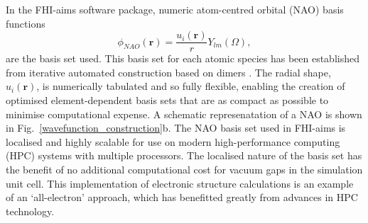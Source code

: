 \documentclass[11pt, twoside]{report}
\begin{document}

In the FHI-aims software package, numeric atom-centred orbital (NAO) basis functions
\begin{equation}\label{aims_basis_set}
\phi_{NAO}(\boldsymbol{r}) = \frac{u_i(\boldsymbol{r})}{r} Y_{lm}(\Omega),
\end{equation}
are the basis set used. This basis set for each atomic species has been established from iterative automated construction based on dimers \cite{FHI-aims_slides}. The radial shape, $u_i(\boldsymbol{r})$, is numerically tabulated and so fully flexible, enabling the creation of optimised element-dependent basis sets that are as compact as possible to minimise computational expense. A schematic represenatation of a NAO is shown in Fig.~\ref{wavefunction_construction}b.
The NAO basis set used in FHI-aims is localised and highly scalable for use on modern high-performance computing (HPC) systems with multiple processors. The localised nature of the basis set has the benefit of no additional computational cost for vacuum gaps in the simulation unit cell. This implementation of electronic structure calculations is an example of an `all-electron' approach, which has benefitted greatly from advances in HPC technology. 

\end{document}
